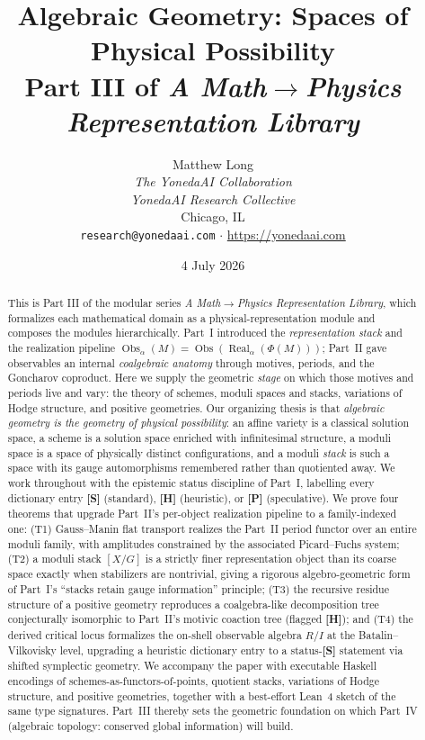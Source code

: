 \documentclass[12pt]{article}
\title{\textbf{Algebraic Geometry: Spaces of Physical Possibility}\\[4pt]
\large Part III of \emph{A Math$\to$Physics Representation Library}}
\author{Matthew Long \\
\textit{The YonedaAI Collaboration} \\
\textit{YonedaAI Research Collective} \\
Chicago, IL \\
\texttt{research@yonedaai.com} $\cdot$ \url{https://yonedaai.com}}
\date{4 July 2026}
\theoremstyle{definition}
\theoremstyle{remark}
\newcommand{\Real}{\operatorname{Real}}
\newcommand{\Obs}{\operatorname{Obs}}
\newcommand{\status}[1]{\textnormal{\textsf{\textbf{[#1]}}}}
\begin{document}
\maketitle

\begin{abstract}
This is Part III of the modular series \emph{A Math$\to$Physics Representation Library}, which
formalizes each mathematical domain as a physical-representation module and composes the modules
hierarchically. Part~I introduced the \emph{representation stack} and the realization pipeline
$\Obs_\alpha(M) = \Obs(\Real_\alpha(\Phi(M)))$; Part~II gave observables an internal
\emph{coalgebraic anatomy} through motives, periods, and the Goncharov coproduct. Here we supply
the geometric \emph{stage} on which those motives and periods live and vary: the theory of schemes,
moduli spaces and stacks, variations of Hodge structure, and positive geometries. Our organizing
thesis is that \emph{algebraic geometry is the geometry of physical possibility}: an affine variety
is a classical solution space, a scheme is a solution space enriched with infinitesimal structure,
a moduli space is a space of physically distinct configurations, and a moduli \emph{stack} is such a
space with its gauge automorphisms remembered rather than quotiented away. We work throughout with the
epistemic status discipline of Part~I, labelling every dictionary entry \status{S} (standard),
\status{H} (heuristic), or \status{P} (speculative). We prove four theorems that upgrade Part~II's
per-object realization pipeline to a family-indexed one: (T1) Gauss--Manin flat transport realizes the
Part~II period functor over an entire moduli family, with amplitudes constrained by the associated
Picard--Fuchs system; (T2) a moduli stack $[X/G]$ is a strictly finer representation object than its
coarse space exactly when stabilizers are nontrivial, giving a rigorous algebro-geometric form of
Part~I's ``stacks retain gauge information'' principle; (T3) the recursive residue structure of a
positive geometry reproduces a coalgebra-like decomposition tree conjecturally isomorphic to Part~II's
motivic coaction tree (flagged \status{H}); and (T4) the derived critical locus formalizes the on-shell
observable algebra $R/I$ at the Batalin--Vilkovisky level, upgrading a heuristic dictionary entry to a
status-\status{S} statement via shifted symplectic geometry. We accompany the paper with executable
\textsf{Haskell} encodings of schemes-as-functors-of-points, quotient stacks, variations of Hodge
structure, and positive geometries, together with a best-effort \textsf{Lean~4} sketch of the same
type signatures. Part~III thereby sets the geometric foundation on which Part~IV (algebraic topology:
conserved global information) will build.
\end{abstract}
\end{document}
